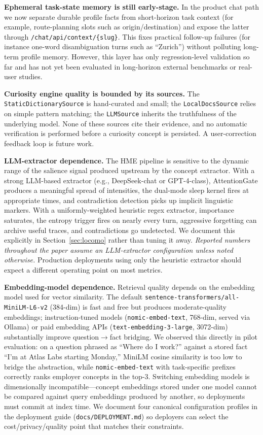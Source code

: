 \documentclass[11pt,twocolumn]{article}
\begin{document}
\textbf{Ephemeral task-state memory is still early-stage.} In the product chat path we now separate durable profile facts from short-horizon task context (for example, route-planning slots such as origin/destination) and expose the latter through \texttt{/chat/api/context/\{slug\}}. This fixes practical follow-up failures (for instance one-word disambiguation turns such as ``Zurich'') without polluting long-term profile memory. However, this layer has only regression-level validation so far and has not yet been evaluated in long-horizon external benchmarks or real-user studies.

\textbf{Curiosity engine quality is bounded by its sources.} The \texttt{StaticDictionarySource} is hand-curated and small; the \texttt{LocalDocsSource} relies on simple pattern matching; the \texttt{LLMSource} inherits the truthfulness of the underlying model. None of these sources cite their evidence, and no automatic verification is performed before a curiosity concept is persisted. A user-correction feedback loop is future work.

\textbf{LLM-extractor dependence.} The HME pipeline is sensitive to the dynamic range of the salience signal produced upstream by the concept extractor. With a strong LLM-based extractor (e.g., DeepSeek-chat or GPT-4-class), AttentionGate produces a meaningful spread of intensities, the dual-mode sleep kernel fires at appropriate times, and contradiction detection picks up implicit linguistic markers. With a uniformly-weighted heuristic regex extractor, importance saturates, the entropy trigger fires on nearly every turn, aggressive forgetting can archive useful traces, and contradictions go undetected. We document this explicitly in Section~\ref{sec:locomo} rather than tuning it away. \emph{Reported numbers throughout the paper assume an LLM-extractor configuration unless noted otherwise.} Production deployments using only the heuristic extractor should expect a different operating point on most metrics.

\textbf{Embedding-model dependence.} Retrieval quality depends on the embedding model used for vector similarity. The default \texttt{sentence-transformers/all-MiniLM-L6-v2} (384-dim) is fast and free but produces moderate-quality embeddings; instruction-tuned models (\texttt{nomic-embed-text}, 768-dim, served via Ollama) or paid embedding APIs (\texttt{text-embedding-3-large}, 3072-dim) substantially improve question$\to$fact bridging. We observed this directly in pilot evaluation: on a question phrased as ``Where do I work?'' against a stored fact ``I'm at Atlas Labs starting Monday,'' MiniLM cosine similarity is too low to bridge the abstraction, while \texttt{nomic-embed-text} with task-specific prefixes correctly ranks employer concepts in the top-3. Switching embedding models is dimensionally incompatible---concept embeddings stored under one model cannot be compared against query embeddings produced by another, so deployments must commit at index time. We document four canonical configuration profiles in the deployment guide (\texttt{docs/DEPLOYMENT.md}) so deployers can select the cost/privacy/quality point that matches their constraints.
\end{document}
